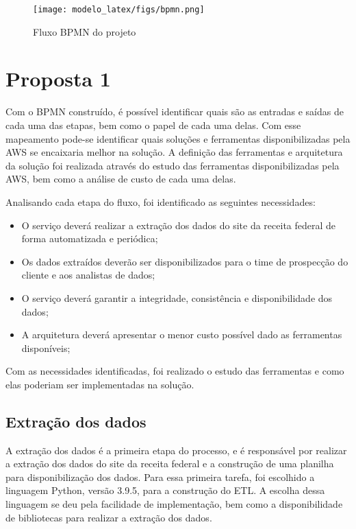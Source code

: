 \begin{figure}[H]
    \centering
    \texttt{[image: modelo\_latex/figs/bpmn.png]}
    \caption{Fluxo BPMN do projeto}
    \label{fig:bpmn}
\end{figure}



\section{Proposta 1}

Com o BPMN construído, é possível identificar quais são as entradas e saídas de cada uma das etapas, bem como o papel de cada uma delas. Com esse mapeamento pode-se identificar quais soluções e ferramentas disponibilizadas pela AWS se encaixaria melhor na solução. A definição das ferramentas e arquitetura da solução foi realizada através do estudo das ferramentas disponibilizadas pela AWS, bem como a análise de custo de cada uma delas.

Analisando cada etapa do fluxo, foi identificado as seguintes necessidades:

\begin{itemize}
    \item O serviço deverá realizar a extração dos dados do site da receita federal de forma automatizada e periódica;
    \item Os dados extraídos deverão ser disponibilizados para o time de prospecção do cliente e aos analistas de dados;
    \item O serviço deverá garantir a integridade, consistência e disponibilidade dos dados;
    \item A arquitetura deverá apresentar o menor custo possível dado as ferramentas disponíveis;
\end{itemize}

Com as necessidades identificadas, foi realizado o estudo das ferramentas e como elas poderiam ser implementadas na solução.

\subsection{Extração dos dados}

A extração dos dados é a primeira etapa do processo, e é responsável por realizar a extração dos dados do site da receita federal e a construção de uma planilha para disponibilização dos dados. Para essa primeira tarefa, foi escolhido a linguagem Python, versão 3.9.5, para a construção do ETL. A escolha dessa linguagem se deu pela facilidade de implementação, bem como a disponibilidade de bibliotecas para realizar a extração dos dados. 

